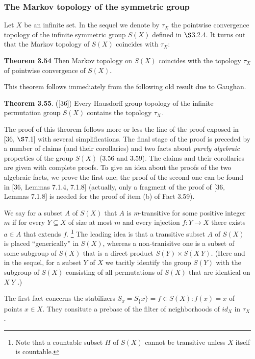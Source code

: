\documentclass[12pt]{article}
\begin{document}
    \subsubsection{The Markov topology of the symmetric group}


        Let $X$ be an infinite set. In the sequel we denote by $\tau_X$ the pointwise convergence topology of the infinite
    symmetric group $S(X)$ defined in $\S$3.2.4. It turns out that the Markov topology of $S(X)$ coincides with $\tau_X$:
    
    
    \textbf{Theorem 3.54} Then Markov topology on $S(X)$ coincides with the topology $\tau_X$ of pointwise convergence of
    $S(X)$.


        This theorem follows immediately from the following old result due to Gaughan.

    
    \textbf{Theorem 3.55}. ([36]) Every Hausdorff group topology of the infinite permutation group $S(X)$ contains the
    topology $\tau_X$.
    
    
        The proof of this theorem follows more or less the line of the proof exposed in [36, $\S$7.1] with several
    simplifications. The final stage of the proof is preceded by a number of claims (and their corollaries) and two
    facts about \emph{purely algebraic} properties of the group $S(X)$ (3.56 and 3.59). The claims and their corollaries are
    given with complete proofs. To give an idea about the proofs of the two algebraic facts, we prove the first one;
    the proof of the second one can be found in [36, Lemmas 7.1.4, 7.1.8] (actually, only a fragment of the proof of
    [36, Lemmas 7.1.8] is needed for the proof of item (b) of Fact 3.59).
    
    
        We say for a subset $A$ of $S(X)$ that $A$ is \emph{m}-transitive for some positive integer $m$ if for every $Y \subseteq X$ of
    size at most $m$ and every injection $f : Y \to X$ there exists $a \in A$ that extends $f$.
    \footnote[5]{Note that a countable subset $H$ of $S(X)$ cannot be transitive unless $X$ itself is countable.}
    The leading idea is that a transitive subset $A$ of $S(X)$ is placed “generically” in $S(X)$, whereas a non-tranisitve one is a subset of some
    subgroup of $S(X)$ that is a direct product $S(Y ) \times S(X \ Y )$. (Here and in the sequel, for a subset $Y$ of $X$
    we tacitly identify the group $S(Y)$ with the subgroup of $S(X)$ consisting of all permutations of $S(X)$ that are
    identical on $X \ Y$ .)
    
    
        The first fact concerns the stabilizers $S_x = S_\{x\} = {f \in S(X) : f(x) = x}$ of points $x \in X$. They consitute
    a prebase of the filter of neighborhoods of $id_X$ in $\tau_X$.
\end{document}
